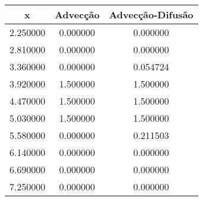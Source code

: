 \begin{tabular}{ccc}
\toprule
x & Advecção & Advecção-Difusão \\
\midrule
2.250000 & 0.000000 & 0.000000 \\
2.810000 & 0.000000 & 0.000000 \\
3.360000 & 0.000000 & 0.054724 \\
3.920000 & 1.500000 & 1.500000 \\
4.470000 & 1.500000 & 1.500000 \\
5.030000 & 1.500000 & 1.500000 \\
5.580000 & 0.000000 & 0.211503 \\
6.140000 & 0.000000 & 0.000000 \\
6.690000 & 0.000000 & 0.000000 \\
7.250000 & 0.000000 & 0.000000 \\
\bottomrule
\end{tabular}
